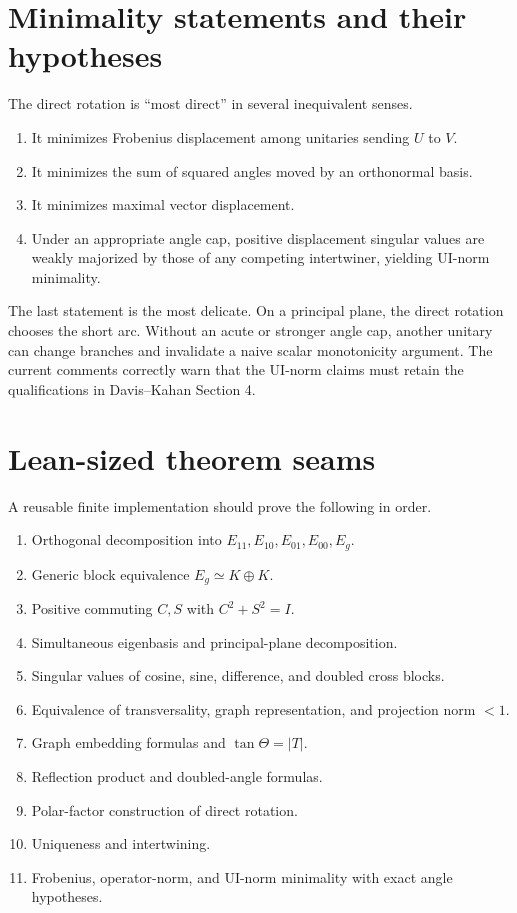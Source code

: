 \section{Minimality statements and their hypotheses}

The direct rotation is ``most direct'' in several inequivalent senses.

\begin{enumerate}
\item It minimizes Frobenius displacement among unitaries sending $U$ to $V$.
\item It minimizes the sum of squared angles moved by an orthonormal basis.
\item It minimizes maximal vector displacement.
\item Under an appropriate angle cap, positive displacement singular values are weakly majorized by those of any competing intertwiner, yielding UI-norm minimality.
\end{enumerate}

The last statement is the most delicate. On a principal plane, the direct rotation chooses the short arc. Without an acute or stronger angle cap, another unitary can change branches and invalidate a naive scalar monotonicity argument. The current  comments correctly warn that the UI-norm claims must retain the qualifications in Davis--Kahan Section 4.

\section{Lean-sized theorem seams}

A reusable finite implementation should prove the following in order.

\begin{enumerate}
\item Orthogonal decomposition into $E_{11},E_{10},E_{01},E_{00},E_g$.
\item Generic block equivalence $E_g\simeq K\oplus K$.
\item Positive commuting $C,S$ with $C^2+S^2=I$.
\item Simultaneous eigenbasis and principal-plane decomposition.
\item Singular values of cosine, sine, difference, and doubled cross blocks.
\item Equivalence of transversality, graph representation, and projection norm $<1$.
\item Graph embedding formulas and $\tan\Theta=|T|$.
\item Reflection product and doubled-angle formulas.
\item Polar-factor construction of direct rotation.
\item Uniqueness and intertwining.
\item Frobenius, operator-norm, and UI-norm minimality with exact angle hypotheses.
\end{enumerate}

